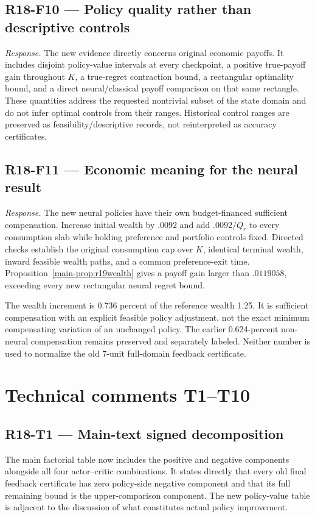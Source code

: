 \subsection{R18-F10 --- Policy quality rather than descriptive controls}
\emph{Response.} The new evidence directly concerns original economic payoffs. It includes disjoint policy-value intervals at every checkpoint, a positive true-payoff gain throughout $K$, a true-regret contraction bound, a rectangular optimality bound, and a direct neural/classical payoff comparison on that same rectangle. These quantities address the requested nontrivial subset of the state domain and do not infer optimal controls from their ranges. Historical control ranges are preserved as feasibility/descriptive records, not reinterpreted as accuracy certificates.

\subsection{R18-F11 --- Economic meaning for the neural result}
\emph{Response.} The new neural policies have their own budget-financed sufficient compensation. Increase initial wealth by $.0092$ and add $.0092/Q_r$ to every consumption slab while holding preference and portfolio controls fixed. Directed checks establish the original consumption cap over $K$, identical terminal wealth, inward feasible wealth paths, and a common preference-exit time. Proposition~\ref{main-prop:r19wealth} gives a payoff gain larger than $.0119058$, exceeding every new rectangular neural regret bound.

The wealth increment is 0.736 percent of the reference wealth 1.25. It is sufficient compensation with an explicit feasible policy adjustment, not the exact minimum compensating variation of an unchanged policy. The earlier 0.624-percent non-neural compensation remains preserved and separately labeled. Neither number is used to normalize the old 7-unit full-domain feedback certificate.

\section{Technical comments T1--T10}
\subsection{R18-T1 --- Main-text signed decomposition}
The main factorial table now includes the positive and negative components alongside all four actor--critic combinations. It states directly that every old final feedback certificate has zero policy-side negative component and that its full remaining bound is the upper-comparison component. The new policy-value table is adjacent to the discussion of what constitutes actual policy improvement.

